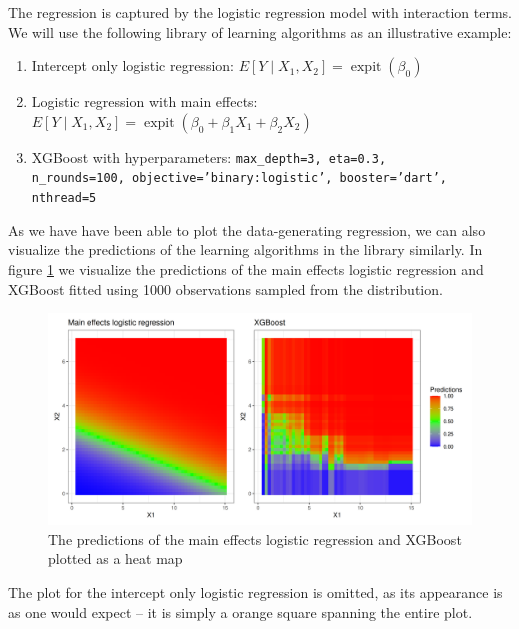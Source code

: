 \documentclass[11pt, a4paper]{article}
\theoremstyle{definition}
\theoremstyle{remark}
\DeclareMathOperator{\expit}{expit}
\begin{document}
The regression is captured by the logistic regression model with interaction terms. We will use the following library of learning algorithms as an illustrative example:
\begin{enumerate}
    \item Intercept only logistic regression: $E[Y \mid X_1, X_2] = \expit(\beta_0)$
    \item Logistic regression with main effects: $E[Y \mid X_1, X_2] = \expit(\beta_0 + \beta_1 X_1 + \beta_2 X_2)$
    \item XGBoost with hyperparameters: \texttt{max\_depth=3, eta=0.3,\\ n\_rounds=100, objective='binary:logistic', booster='dart', nthread=5}
\end{enumerate}
As we have have been able to plot the data-generating regression, we can also visualize the predictions of the learning algorithms in the library similarly. In figure \ref{fig:predictpar} we visualize the predictions of the main effects logistic regression and XGBoost fitted using 1000 observations sampled from the distribution. 
\begin{figure}[H]
    \centering
    \includegraphics[width=\textwidth]{figures/predictpar.png}
    \caption{The predictions of the main effects logistic regression and XGBoost plotted as a heat map}
    \label{fig:predictpar}
\end{figure}
The plot for the intercept only logistic regression is omitted, as its appearance is as one would expect -- it is simply a orange square spanning the entire plot.
\end{document}
